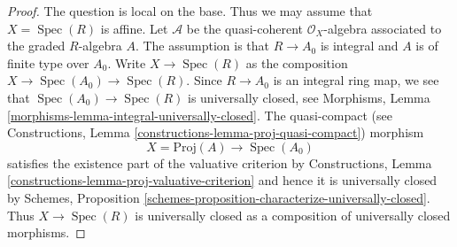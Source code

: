 \documentclass[10pt,a4paper]{amsart}
\theoremstyle{plain}
\theoremstyle{definition}
\theoremstyle{remark}
\numberwithin{equation}{subsection}
\def\Spec{\mathop{\mathrm{Spec}}}
\begin{document}
\begin{proof}
The question is local on the base. Thus we may assume that $X = \Spec(R)$
is affine. Let $\mathcal{A}$ be the quasi-coherent $\mathcal{O}_X$-algebra
associated to the graded $R$-algebra $A$. The assumption is that $R \to A_0$
is integral and $A$ is of finite type over $A_0$.
Write $X \to \Spec(R)$ as the composition $X \to \Spec(A_0) \to \Spec(R)$.
Since $R \to A_0$ is an integral ring map, we see that
$\Spec(A_0) \to \Spec(R)$ is universally closed, see
Morphisms, Lemma \ref{morphisms-lemma-integral-universally-closed}.
The quasi-compact (see
Constructions, Lemma \ref{constructions-lemma-proj-quasi-compact}) morphism
$$
X = \text{Proj}(A) \to \Spec(A_0)
$$
satisfies the existence part of the valuative criterion by
Constructions, Lemma \ref{constructions-lemma-proj-valuative-criterion}
and hence it is universally closed by
Schemes, Proposition \ref{schemes-proposition-characterize-universally-closed}.
Thus $X \to \Spec(R)$ is universally closed as a composition of
universally closed morphisms.
\end{proof}
\end{document}
